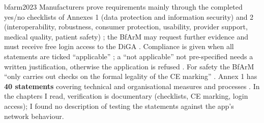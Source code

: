 \begin{papercard}{bfarm2023}
 Manufacturers prove requirements mainly through the completed yes/no checklists of Annexes 1 (data protection and information security) and 2 (interoperability, robustness, consumer protection, usability, provider support, medical quality, patient safety) ; the BfArM may request further evidence and must receive free login access to the DiGA . Compliance is given when all statements are ticked ``applicable'' ; a ``not applicable'' not pre-specified needs a written justification, otherwise the application is refused . For safety the BfArM ``only carries out checks on the formal legality of the CE marking'' . Annex 1 has \textbf{40 statements} covering technical and organisational measures and processes . In the chapters I read, verification is documentary (checklists, CE marking, login access); I found no description of testing the statements against the app's network behaviour.


\end{papercard}
